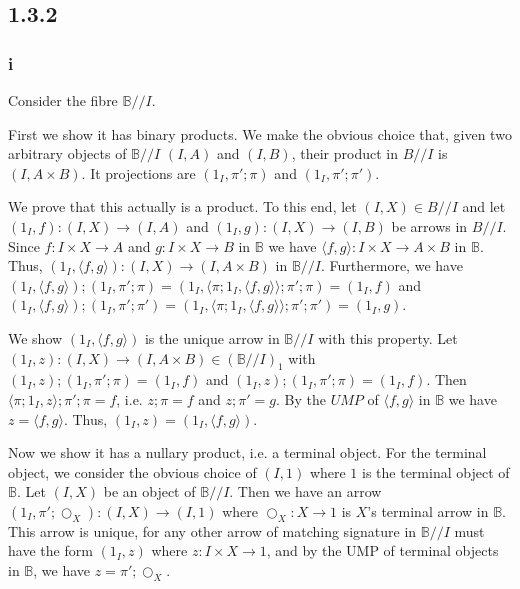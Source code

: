 \documentclass{article}
\begin{document}
\subsection*{1.3.2}
\newcommand{\dd}{/\!/}
 
\subsubsection*{i}

Consider the fibre $\mathbb B \dd I$. 

First we show it has binary products. We make the obvious choice that, given two arbitrary objects of $\mathbb B / \! / I$
$(I,A)$ and $(I,B)$, their product in $B \dd I$ is $(I, A \times B)$. It projections are $(1_I, \pi';\pi)$ and 
$(1_I, \pi';\pi')$.

We prove that this actually is a product. To this end,
let $(I,X) \in B \dd I$ and let $(1_I, f) : (I,X) \to (I,A)$ and $(1_I, g) : (I,X) \to (I,B)$ be arrows in $B \dd I$.
Since $f : I \times X \to A$ and $g : I \times X \to B$ in $\mathbb B$ we have $\langle f, g \rangle : I \times X \to A \times B$ in $\mathbb B$. Thus, $(1_I, \langle f,g \rangle) : (I,X) \to (I, A \times B)$ in $\mathbb B \dd I$.
Furthermore, we have $(1_I, \langle f,g \rangle);(1_I,\pi';\pi) = (1_I, \langle \pi;1_I, \langle f,g \rangle \rangle;\pi';\pi)
 = (1_I, f)$ and
$(1_I, \langle f,g \rangle);(1_I,\pi';\pi') = (1_I, \langle \pi;1_I, \langle f,g \rangle \rangle;\pi';\pi')
 = (1_I, g)$.

We show $(1_I, \langle f,g \rangle)$ is the unique arrow in $\mathbb B \dd I$ with this property.
Let $(1_I,z) : (I,X) \to (I, A \times B) \in (\mathbb B \dd I)_1$ with $(1_I, z);(1_I,\pi';\pi) = (1_I, f)$
and $(1_I, z);(1_I,\pi';\pi) = (1_I, f)$.
Then $\langle \pi;1_I, z \rangle;\pi';\pi = f$, i.e. $z;\pi = f$ and $z;\pi' = g$. By the $UMP$ of $\langle f,g \rangle$ 
in $\mathbb B$ we have $z = \langle f, g \rangle$. Thus, $(1_I,z) = (1_I, \langle f,g \rangle)$.

Now we show it has a nullary product, i.e. a terminal object. For the terminal object, we consider the obvious choice of 
$(I,1)$ where $1$ is the terminal object of $\mathbb B$. Let $(I,X)$ be an object of $\mathbb B \dd I$. Then
we have an arrow $(1_I, \pi';\bigcirc_{X}) : (I,X) \to (I,1)$ where $\bigcirc_X : X \to 1$ is $X$'s terminal
arrow in $\mathbb B$. This arrow is unique, for any other arrow of matching signature in $\mathbb B \dd I$
must have the form $(1_I,z)$ where $z : I \times X \to 1$, and by the UMP of terminal objects in $\mathbb B$, we have
$z = \pi';\bigcirc_{X}$.
\end{document}
